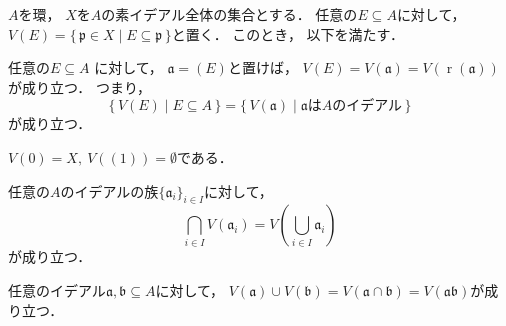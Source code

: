 \documentclass{jlreq}
\newcommand{\GeneratedIdealBy}[1]{\left(#1\right)}
\DeclareMathOperator{\Radical}{r}
\begin{document}
	\begin{proposition}[p.\,19; 演習問題15]
		$A$を環，
		$X$を$A$の素イデアル全体の集合とする．
		任意の$E \subseteq A$に対して，
		$V(E) = \{\, \mathfrak{p} \in X \mid E \subseteq \mathfrak{p} \,\}$と置く．
		このとき，
		以下を満たす．
		\begin{propenum}
			\item\label{AM:ex.1.15.1} 任意の$E \subseteq A$ に対して，
			$\mathfrak{a} = \GeneratedIdealBy{E}$と置けば，
			$V(E) = V(\mathfrak{a}) = V(\Radical(\mathfrak{a}))$が成り立つ．
			つまり，
			\begin{equation}
				\{\, V(E) \mid E \subseteq A \,\}
				= \{\, V(\mathfrak{a}) \mid \text{$\mathfrak{a}$は$A$のイデアル} \,\}
			\end{equation}
			が成り立つ．
			\item\label{AM:ex.1.15.2} $V(0) = X,\ V(\GeneratedIdealBy{1}) = \emptyset$である．
			\item\label{AM:ex.1.15.3} 任意の$A$のイデアルの族$\{ \mathfrak{a}_i \}_{i \in I}$に対して，
			\begin{equation}
				\bigcap_{i \in I} V \left( \mathfrak{a}_i \right)
				= V \left( \bigcup_{i \in I} \mathfrak{a}_i \right)
			\end{equation}
			が成り立つ．
			\item\label{AM:ex.1.15.4} 任意のイデアル$\mathfrak{a}, \mathfrak{b} \subseteq A$に対して，
			$V(\mathfrak{a}) \cup V(\mathfrak{b}) = V(\mathfrak{a} \cap \mathfrak{b}) = V(\mathfrak{a}\mathfrak{b})$が成り立つ．
		\end{propenum}
	\end{proposition}
	
\end{document}
